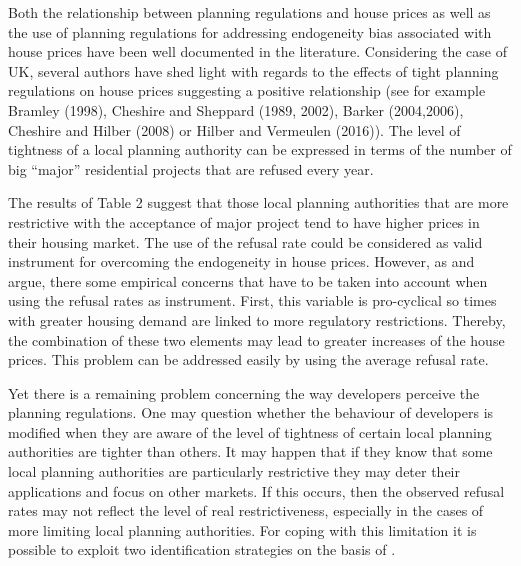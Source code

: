 \documentclass[12pt,letterpaper]{article}
\begin{document}
  Both the relationship between planning regulations and house prices as well as the use of planning regulations 
  for addressing endogeneity bias associated with house prices have been well documented in the literature. 
  Considering the case of UK, several authors have shed light with regards to the effects of tight planning 
  regulations on house prices suggesting a positive relationship
   (see for example \citet{bramley1998measuring, barker2004barker, hilber2016supply} Bramley (1998), Cheshire and Sheppard (1989, 2002), Barker (2004,2006), Cheshire and Hilber (2008) or Hilber and Vermeulen (2016)). 
The level of tightness of a local planning authority can be expressed in terms of the number of big “major”
 residential projects that are refused every year. 
    
    The results of Table 2 suggest that those local planning authorities that are more restrictive with the acceptance of 
    major project tend to have higher prices in their housing market. The use of the refusal rate could be considered
     as valid instrument for overcoming the endogeneity in house prices. However,
      as \citet{hilber2016supply} and \cite{hilber2015} argue, there some empirical concerns that have to be
       taken into account when using the refusal rates as instrument. First, this variable is pro-cyclical so 
       times with greater housing demand are linked to more regulatory restrictions. Thereby,
        the combination of these two elements may lead to greater increases of the house prices. 
        This problem can be addressed easily by using the average refusal rate. 
        
Yet there is a remaining problem concerning the way developers perceive the planning regulations. 
One may question whether the behaviour of developers is modified when they are aware of the level
 of tightness of certain local planning authorities are tighter than others. It may happen that if they know
  that some local planning authorities are particularly restrictive they may deter their applications and focus
   on other markets. If this occurs, then the observed refusal rates may not reflect the level of real 
   restrictiveness, especially in the cases of more limiting local planning authorities. For coping with this
    limitation it is possible to exploit two identification strategies on the basis of \cite{hilber2016supply}.
    
\end{document}
